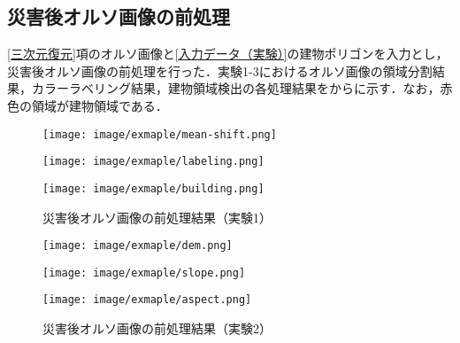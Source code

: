     \subsection{災害後オルソ画像の前処理}
      \label{災害後オルソ画像の前処理}
      \ref{三次元復元}項のオルソ画像と\ref{入力データ（実験）}の建物ポリゴンを入力とし，災害後オルソ画像の前処理を行った．実験1-3におけるオルソ画像の領域分割結果，カラーラベリング結果，建物領域検出の各処理結果をからに示す．なお，赤色の領域が建物領域である．

      \begin{figure}[t]
        \begin{minipage}[c]{0.329\hsize}
          \centering
          \texttt{[image: image/exmaple/mean-shift.png]}
        \end{minipage}
        \begin{minipage}[c]{0.329\hsize}
          \centering
          \texttt{[image: image/exmaple/labeling.png]}
        \end{minipage}
        \begin{minipage}[c]{0.329\hsize}
          \centering
          \texttt{[image: image/exmaple/building.png]}
        \end{minipage}
        \caption{災害後オルソ画像の前処理結果（実験1）}
        \label{災害後オルソ画像の前処理結果（実験1）}
      \end{figure}

      \begin{figure}[t]
        \begin{minipage}[c]{0.329\hsize}
          \centering
          \texttt{[image: image/exmaple/dem.png]}
        \end{minipage}
        \begin{minipage}[c]{0.329\hsize}
          \centering
          \texttt{[image: image/exmaple/slope.png]}
        \end{minipage}
        \begin{minipage}[c]{0.329\hsize}
          \centering
          \texttt{[image: image/exmaple/aspect.png]}
        \end{minipage}
        \caption{災害後オルソ画像の前処理結果（実験2）}      
      \end{figure}

